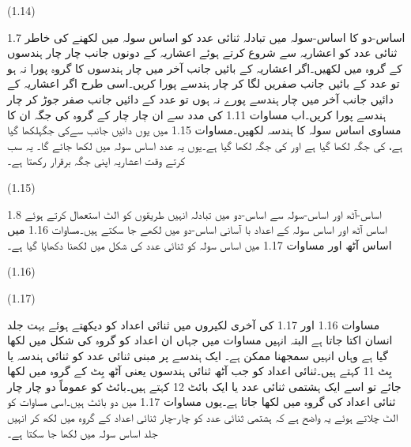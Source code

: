  
(1.14)

1.7 اساس-دو کا اساس-سولہ میں تبادلہ
	ثنائی عدد کو اساس سولہ میں لکھنے کی خاطر ثنائی عدد کو اعشاریہ سے شروع کرتے ہوئے اعشاریہ کے دونوں جانب  چار چار ہندسوں کے گروہ میں لکھیں۔اگر اعشاریہ کے بائیں جانب آخر میں چار ہندسوں کا گروہ پورا نہ ہو تو عدد کے  بائیں جانب صفریں لگا کر چار ہندسے پورا کریں۔اسی طرح اگر اعشاریہ کے دائیں جانب آخر میں چار ہندسے پورے نہ ہوں تو عدد کے دائیں جانب صفر جوڑ کر چار ہندسے پورا کریں۔اب مساوات 1.11  کی مدد سے ان چار چار کے گروہ کی جگہ ان کا مساوی اساس سولہ کا ہندسہ لکھیں۔مساوات 1.15 میں یوں دائیں جانب سےکی جگہلکھا گیا ہے، کی جگہ   لکھا گیا ہے اور   کی جگہ   لکھا گیا ہے۔یوں یہ عدد اساس سولہ میں   لکھا جائے گا۔ یہ سب کرتے وقت اعشاریہ اپنی جگہ برقرار رکھتا ہے۔
 
 
(1.15)

1.8 اساس-آٹھ اور اساس-سولہ سے اساس-دو میں تبادلہ
	انہیں طریقوں کو الٹ استعمال کرتے ہوئے اساس آٹھ اور اساس سولہ کے اعداد با آسانی اساس-دو میں لکھے جا سکتے ہیں۔مساوات 1.16 میں اساس آٹھ اور مساوات 1.17 میں اساس سولہ کو ثنائی عدد کی شکل میں لکھنا دکھایا گیا ہے۔ 
 
(1.16)



 
(1.17)

	مساوات 1.16 اور 1.17 کی آخری لکیروں میں ثنائی اعداد کو دیکھتے ہوئے بہت جلد انسان اکتا جاتا ہے البتہ انہیں مساوات میں جہاں ان اعداد کو گروہ کی شکل میں لکھا گیا ہے وہاں انہیں سمجھنا ممکن ہے۔ 
	ایک ہندسے پر مبنی ثنائی عدد کو ثنائی ہندسہ یا بِٹ 11 کہتے ہیں۔ثنائی اعداد کو جب  آٹھ ثنائی ہندسوں یعنی آٹھ بِٹ کے گروہ میں لکھا جائے  تو اسے ایک ہشتمی ثنائی عدد یا ایک بائٹ 12 کہتے ہیں۔بائٹ کو  عموماً دو چار چار ثنائی اعداد کی گروہ میں لکھا جاتا ہے۔یوں مساوات 1.17 میں دو بائٹ ہیں۔اسی مساوات کو الٹ چلاتے ہوئے یہ واضح ہے کہ ہشتمی ثنائی عدد کو چار-چار ثنائی اعداد کے  گروہ میں لکھ کر انہیں جلد اساس سولہ میں لکھا جا سکتا ہے۔
